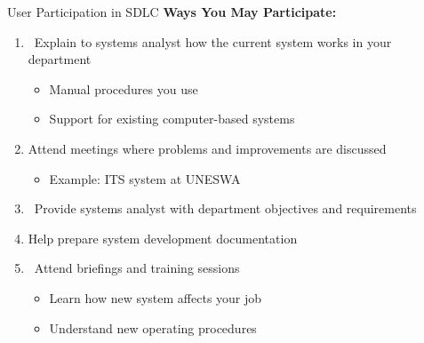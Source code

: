 \documentclass[aspectratio=169]{beamer}
\begin{document}
\begin{frame}{User Participation in SDLC}
    \textbf{Ways You May Participate:}
    
    \begin{enumerate}
        \item\, Explain to systems analyst how the current system works in your department
        \begin{itemize}
            \item Manual procedures you use
            \item Support for existing computer-based systems
        \end{itemize}
        
        \item Attend meetings where problems and improvements are discussed
        \begin{itemize}
            \item Example: ITS system at UNESWA
        \end{itemize}
        
        \item\, Provide systems analyst with department objectives and requirements
        
        \item Help prepare system development documentation
        
        \item\, Attend briefings and training sessions
        \begin{itemize}
            \item Learn how new system affects your job
            \item Understand new operating procedures
        \end{itemize}
    \end{enumerate}
\end{frame}
\end{document}
